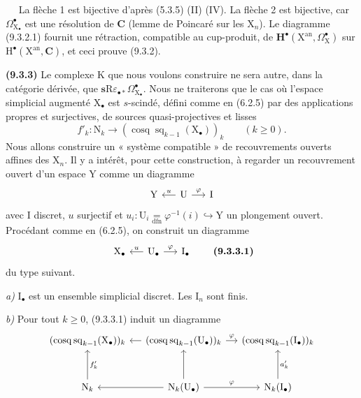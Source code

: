\documentclass[11pt,leqno]{article}
\newcommand{\Page}[1]{\ifvmode\noindent\else\unskip\ \fi{\footnotesize\textcolor{gray}{[p.\,#1]}}\ \ignorespaces}
\begin{document}
\Page{51}
La flèche 1 est bijective d’après (5.3.5) (II) (IV). La flèche 2 est bijective, car \(\Omega_{\mathrm{X}_{\bullet}}^{\bullet}\) est une résolution de \(\mathbf{C}\) (lemme de Poincaré sur les \(\mathrm{X}_{n}\)). Le diagramme (9.3.2.1) fournit une rétraction, compatible au cup-produit, de \(\mathbf{H}^{\bullet}(\mathrm{X}^{\mathrm{an}},\Omega_{\mathrm{X}}^{\bullet})\) sur \(\mathrm{H}^{\bullet}(\mathrm{X}^{\mathrm{an}},\mathbf{C})\), et ceci prouve (9.3.2).

\textbf{(9.3.3)} Le complexe \(\mathrm{K}\) que nous voulons construire ne sera autre, dans la catégorie dérivée, que \(\mathbf{s}\mathrm{R}\varepsilon_{\bullet *}\Omega_{\mathrm{X}_{\bullet}}^{\bullet}\). Nous ne traiterons que le cas où l’espace simplicial augmenté \(\mathrm{X}_{\bullet}\) est \(s\)-scindé, défini comme en (6.2.5) par des applications propres et surjectives, de sources quasi-projectives et lisses
\[
f'_{k}:\mathrm{N}_{k}\to
(\operatorname{cosq}\operatorname{sq}_{k-1}(\mathrm{X}_{\bullet}))_{k}
\qquad(k\geq0).
\]
Nous allons construire un « système compatible » de recouvrements ouverts affines des \(\mathrm{X}_{n}\). Il y a intérêt, pour cette construction, à regarder un recouvrement ouvert d’un espace \(\mathrm{Y}\) comme un diagramme
\[
\begin{tikzcd}[ampersand replacement=\&, column sep=1.4em]
\mathrm{Y}
\&
\mathrm{U}\arrow[l, "u"']\arrow[r, "\varphi"]
\&
\mathrm{I}
\end{tikzcd}
\]
avec \(\mathrm{I}\) discret, \(u\) surjectif et \(u_{i}:\mathrm{U}_{i}\underset{\mathrm{dfn}}{=}\varphi^{-1}(i)\hookrightarrow\mathrm{Y}\) un plongement ouvert. Procédant comme en (6.2.5), on construit un diagramme
\[
\begin{tikzcd}[ampersand replacement=\&, column sep=1.4em]
\mathrm{X}_{\bullet}
\&
\mathrm{U}_{\bullet}\arrow[l, "u"']\arrow[r, "\varphi"]
\&
\mathrm{I}_{\bullet}
\end{tikzcd}
\tag*{\textbf{(9.3.3.1)}}
\]
du type suivant.

\textit{a)} \(\mathrm{I}_{\bullet}\) est un ensemble simplicial discret. Les \(\mathrm{I}_{n}\) sont finis.

\textit{b)} Pour tout \(k\geq0\), (9.3.3.1) induit un diagramme
\[
\begin{tikzcd}[ampersand replacement=\&, column sep=1.2em, row sep=3em]
(\operatorname{cosq}\operatorname{sq}_{k-1}(\mathrm{X}_{\bullet}))_{k}
\&
(\operatorname{cosq}\operatorname{sq}_{k-1}(\mathrm{U}_{\bullet}))_{k}
  \arrow[l]\arrow[r, "\varphi"]
\&
(\operatorname{cosq}\operatorname{sq}_{k-1}(\mathrm{I}_{\bullet}))_{k}
\\
\mathrm{N}_{k}\arrow[u, "f'_{k}"']
\&
\mathrm{N}_{k}(\mathrm{U}_{\bullet})
  \arrow[l]\arrow[u]\arrow[r, "\varphi"]
\&
\mathrm{N}_{k}(\mathrm{I}_{\bullet})\arrow[u, "a'_{k}"']
\end{tikzcd}
\]
\end{document}
